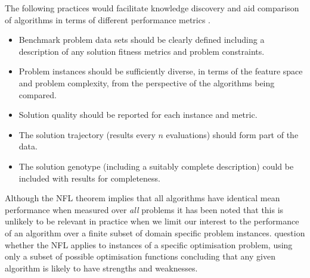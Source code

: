 \documentclass[a4paper]{article}
\begin{document}
The following practices would facilitate knowledge discovery and aid comparison of algorithms in terms of different performance metrics .

\begin{itemize}
\item Benchmark problem data sets should be clearly defined including a description of any solution fitness metrics and problem constraints.
\item Problem instances should be sufficiently diverse, in terms of the feature space and problem complexity, from the perspective of the algorithms being compared.
\item Solution quality should be reported for each instance and metric.
\item The solution trajectory (results every $n$ evaluations) should form part of the data.
\item The solution genotype (including a suitably complete description) could be included with results for completeness.
\end{itemize}

%
%


Although the NFL theorem implies that all algorithms have identical mean performance when measured over \emph{all} problems it has been noted \citep{Igel2005} that this is unlikely to be relevant in practice when we limit our interest to the performance of an algorithm over a finite subset of domain specific problem instances. \cite{SmithMiles2014} question whether the NFL applies to instances of a specific optimisation problem, using only a subset of possible optimisation functions concluding that any given algorithm is likely to have strengths and weaknesses.
\end{document}
